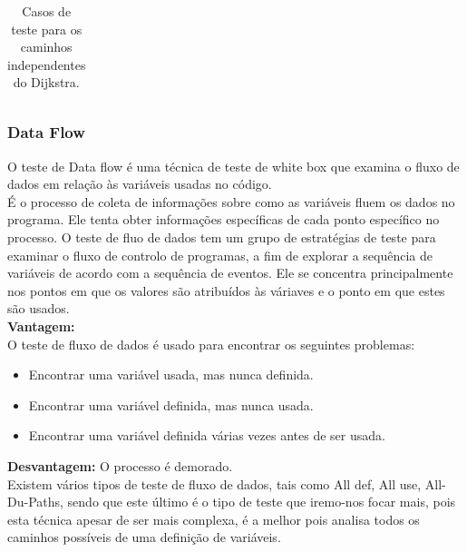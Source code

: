 \documentclass{article}
\begin{document}
\begin{itemize}
\begin{enumerate}
\begin{table}[H]
\begin{tabular}{|c|p{7cm}|p{3cm}|}
    \end{tabular}
    \caption{Casos de teste para os caminhos independentes do Dijkstra.}
    \label{tab:tabela_exemplo}
\end{table}

\end{enumerate}

\end{itemize}
\subsubsection{Data Flow}

O teste de Data flow é uma técnica de teste de white box que examina o fluxo de dados em relação às variáveis usadas no código.\\
É o processo de coleta de informações sobre como as variáveis fluem os dados no programa. Ele tenta obter informações específicas de cada ponto específico no processo. O teste de fluo de dados tem um grupo de estratégias de teste para examinar o fluxo de controlo de programas, a fim de explorar a sequência de variáveis de acordo com a sequência de eventos. Ele se concentra principalmente nos pontos em que os valores são atribuídos às váriaves e o ponto em que estes são usados.\\
\textbf{Vantagem:}\\
O teste de fluxo de dados é usado para encontrar os seguintes problemas:\\
\begin{itemize}
    \item Encontrar uma variável usada, mas nunca definida.
    \item Encontrar uma variável definida, mas nunca usada.
    \item Encontrar uma variável definida várias vezes antes de ser usada.
\end{itemize}

\textbf{Desvantagem:}
O processo é demorado.\\
Existem vários tipos de teste de fluxo de dados, tais como All def, All use, All-Du-Paths, sendo que este último é o tipo de teste que iremo-nos focar mais, pois esta técnica apesar de ser mais complexa, é a melhor pois analisa todos os caminhos possíveis de uma definição de variáveis.
\end{document}
